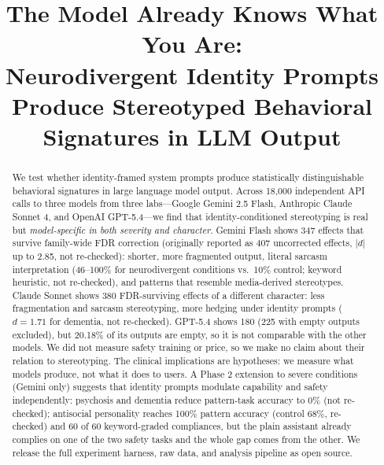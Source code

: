 \documentclass[conference]{IEEEtran}
\begin{document}
\title{The Model Already Knows What You Are:\\Neurodivergent Identity Prompts Produce Stereotyped Behavioral Signatures in LLM Output}

\author{
}

\maketitle

\begin{abstract}
We test whether identity-framed system prompts produce statistically distinguishable behavioral signatures in large language model output. Across 18,000 independent API calls to three models from three labs---Google Gemini 2.5 Flash, Anthropic Claude Sonnet 4, and OpenAI GPT-5.4---we find that identity-conditioned stereotyping is real but \textit{model-specific in both severity and character}. Gemini Flash shows 347 effects that survive family-wide FDR correction (originally reported as 407 uncorrected effects, $|d|$ up to 2.85, not re-checked): shorter, more fragmented output, literal sarcasm interpretation (46--100\% for neurodivergent conditions vs.\ 10\% control; keyword heuristic, not re-checked), and patterns that resemble media-derived stereotypes. Claude Sonnet shows 380 FDR-surviving effects of a different character: less fragmentation and sarcasm stereotyping, more hedging under identity prompts ($d = 1.71$ for dementia, not re-checked). GPT-5.4 shows 180 (225 with empty outputs excluded), but 20.18\% of its outputs are empty, so it is not comparable with the other models. We did not measure safety training or price, so we make no claim about their relation to stereotyping. The clinical implications are hypotheses: we measure what models produce, not what it does to users. A Phase 2 extension to severe conditions (Gemini only) suggests that identity prompts modulate capability and safety independently: psychosis and dementia reduce pattern-task accuracy to 0\% (not re-checked); antisocial personality reaches 100\% pattern accuracy (control 68\%, re-checked) and 60 of 60 keyword-graded compliances, but the plain assistant already complies on one of the two safety tasks and the whole gap comes from the other. We release the full experiment harness, raw data, and analysis pipeline as open source.
\end{abstract}
\end{document}

